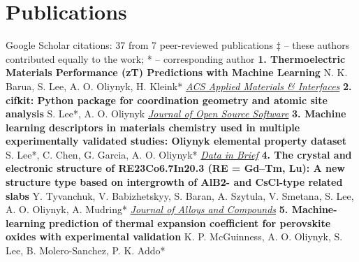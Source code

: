\documentclass{article}%
\begin{document}
\section*{Publications}%
\label{sec:Publications}%
Google Scholar citations: 37 from 7 peer{-}reviewed publications\newline%
\newline%
%
‡ – these authors contributed equally to the work; * – corresponding author\newline%
\newline%
%
\textbf{1. Thermoelectric Materials Performance (zT) Predictions with Machine Learning\newline%
}%
N. K. Barua, S. Lee, A. O. Oliynyk, H. Kleink*\newline%
%
\href{https://doi.org/10.1021/acsami.4c19149}{\textit{ACS Applied Materials \& Interfaces}}%
\newline%
\newline%
%
\textbf{2. cifkit: Python package for coordination geometry and atomic site analysis\newline%
}%
S. Lee*, A. O. Oliynyk\newline%
%
\href{https://doi.org/10.1021/acsami.4c19149}{\textit{Journal of Open Source Software}}%
\newline%
\newline%
%
\textbf{3. Machine learning descriptors in materials chemistry used in multiple experimentally validated studies: Oliynyk elemental property dataset\newline%
}%
S. Lee*, C. Chen, G. Garcia, A. O. Oliynyk*\newline%
%
\href{https://doi.org/10.1016/j.dib.2024.110178}{\textit{Data in Brief}}%
\newline%
\newline%
%
\textbf{4. The crystal and electronic structure of RE23Co6.7In20.3 (RE = Gd–Tm, Lu): A new structure type based on intergrowth of AlB2{-} and CsCl{-}type related slabs\newline%
}%
Y. Tyvanchuk, V. Babizhetskyy, S. Baran, A. Szytula, V. Smetana, S. Lee, A. O. Oliynyk, A. Mudring*\newline%
%
\href{https://doi.org/10.1021/acsami.4c19149}{\textit{Journal of Alloys and Compounds}}%
\newline%
\newline%
%
\textbf{5. Machine{-}learning prediction of thermal expansion coefficient for perovskite oxides with experimental validation\newline%
}%
K. P. McGuinness, A. O. Oliynyk, S. Lee, B. Molero{-}Sanchez, P. K. Addo*\newline%
\end{document}
